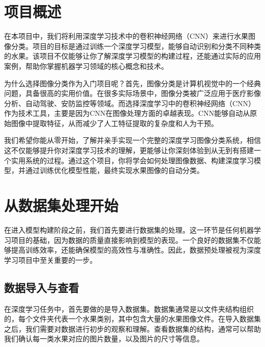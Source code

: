 \section{项目概述}
在本项目中，我们将利用深度学习技术中的卷积神经网络（CNN）来进行水果图像分类。项目的目标是通过训练一个深度学习模型，能够自动识别和分类不同种类的水果。该项目不仅能够让你了解深度学习模型的构建过程，还能通过实际的应用案例，帮助你掌握机器学习领域的核心概念和技术。

为什么选择图像分类作为入门项目呢？首先，图像分类是计算机视觉中的一个经典问题，具备很高的实用价值。在很多实际场景中，图像分类被广泛应用于医疗影像分析、自动驾驶、安防监控等领域。而选择深度学习中的卷积神经网络（CNN）作为技术工具，主要是因为CNN在图像处理方面的卓越表现。CNN能够自动从原始图像中提取特征，从而减少了人工特征提取的复杂度和人为干预。

我们希望你能从零开始，了解并亲手实现一个完整的深度学习图像分类系统，相信这不仅能够提升你对深度学习技术的理解，更能够让你深刻体验到从无到有搭建一个实用系统的过程。通过这个项目，你将学会如何处理图像数据、构建深度学习模型，并通过训练优化模型性能，最终实现水果图像的自动分类。

\section{从数据集处理开始}
在进入模型构建阶段之前，我们首先要进行数据集的处理。这一环节是任何机器学习项目的基础，因为数据的质量直接影响到模型的表现。一个良好的数据集不仅能够提高训练效率，还能确保模型的高效性与准确性。因此，数据预处理被视为深度学习项目中至关重要的一步。
\subsection{数据导入与查看}
在深度学习任务中，首先要做的是导入数据集。数据集通常是以文件夹结构组织的，每个文件夹代表一个水果类别，其中包含大量的水果图像文件。在导入数据集之后，我们需要对数据进行初步的观察和理解。查看数据集的结构，通常可以帮助我们确认每一类水果对应的图片数量，以及图片的尺寸等信息。


